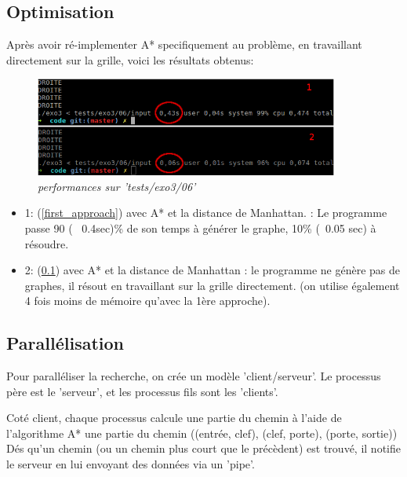 \documentclass[10pt]{article}
\begin{document}
		\subsection{Optimisation} \label{ssec:optimisation}
			Après avoir ré-implementer A* specifiquement au problème, en travaillant directement sur la grille,
			voici les résultats obtenus:
			\begin{figure}[H]
				\begin{center}
					\includegraphics[width=10cm,height=\textheight,keepaspectratio]{./images/manhattan_performances.png}
				\end{center}
				\caption{\textit{performances sur 'tests/exo3/06'}}
			\end{figure}

			\begin{itemize}[label=-]
				\setlength\itemsep{0.1em}
				\item 1: (\ref{first_approach}) avec A* et la distance de Manhattan. : Le programme passe 90 (~ 0.4sec)\%
				de son temps à générer le graphe, 10\% (~0.05 sec) à résoudre.
				\item 2: (\ref{ssec:optimisation}) avec A* et la distance de Manhattan : le programme ne génère pas de graphes, il résout
				en travaillant sur la grille directement. (on utilise également 4 fois moins de mémoire qu'avec la 1ère approche).
			\end{itemize}

		\subsection{Parallélisation}
			Pour paralléliser la recherche, on crée un modèle 'client/serveur'.
			Le processus père est le 'serveur', et les processus fils sont les 'clients'.\newline

			Coté client, chaque processus calcule une partie du chemin à l'aide de l'algorithme A*
			une partie du chemin ((entrée, clef), (clef, porte), (porte, sortie))
			Dés qu'un chemin (ou un chemin plus court que le précèdent) est trouvé, il notifie le serveur
			en lui envoyant des données via un 'pipe'.\newline
			
\end{document}
